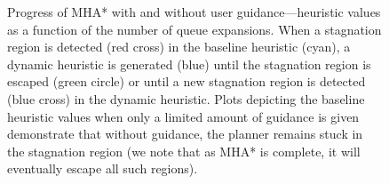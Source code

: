 \documentclass[conference]{IEEEtran}
\begin{document}
\begin{figure}[t]%
  \centering%


  \caption{%
    Progress of MHA* with and without user guidance---heuristic values as a function of the number of queue expansions.
		When a stagnation region is detected (red cross) in the baseline heuristic (cyan), a dynamic heuristic is generated (blue) until the stagnation region is escaped (green circle) or until a new stagnation region is detected (blue cross) in the dynamic heuristic.
		Plots depicting the baseline heuristic values when only a limited amount of guidance is given demonstrate that without guidance, the planner remains stuck in the stagnation region (we note that as MHA* is complete, it will eventually escape all such regions).}


  \label{fig:h_plot}%

  \vspace{-4.5mm}

\end{figure}
\end{document}
